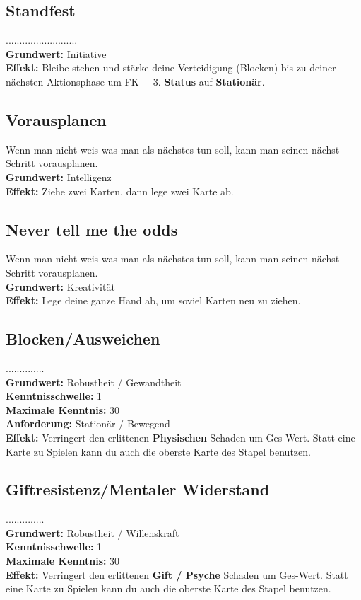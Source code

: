 \subsection*{Standfest} \label{sk:standfest}
..........................\\
\textbf{Grundwert:} Initiative \\
\textbf{Effekt:} Bleibe stehen und stärke deine Verteidigung (Blocken) bis zu deiner nächsten Aktionsphase um FK + 3. \textbf{Status} auf \textbf{Stationär}.

\subsection*{Vorausplanen} \label{sk:vorausplanen}
Wenn man nicht weis was man als nächstes tun soll, kann man seinen nächst Schritt vorausplanen. \\
\textbf{Grundwert:} Intelligenz \\
\textbf{Effekt:} Ziehe zwei Karten, dann lege zwei Karte ab.

\subsection*{Never tell me the odds} \label{never_tell_me_the_odds}
Wenn man nicht weis was man als nächstes tun soll, kann man seinen nächst Schritt vorausplanen. \\
\textbf{Grundwert:} Kreativität \\
\textbf{Effekt:} Lege deine ganze Hand ab, um soviel Karten neu zu ziehen.

\subsection*{Blocken/Ausweichen} \label{sk:blocken/ausweichen}
..............\\
\textbf{Grundwert:} Robustheit / Gewandtheit \\
\textbf{Kenntnisschwelle:} 1 \\
\textbf{Maximale Kenntnis:} 30 \\
\textbf{Anforderung:} Stationär / Bewegend \\
\textbf{Effekt:} Verringert den erlittenen \textbf{Physischen} Schaden um Ges-Wert. Statt eine Karte zu Spielen kann du auch die oberste Karte des Stapel benutzen.

\subsection*{Giftresistenz/Mentaler Widerstand} \label{sk:giftresistenz/mentaler_widerstand}
..............\\
\textbf{Grundwert:} Robustheit / Willenskraft \\
\textbf{Kenntnisschwelle:} 1 \\
\textbf{Maximale Kenntnis:} 30 \\
\textbf{Effekt:} Verringert den erlittenen \textbf{Gift / Psyche} Schaden um Ges-Wert. Statt eine Karte zu Spielen kann du auch die oberste Karte des Stapel benutzen.

